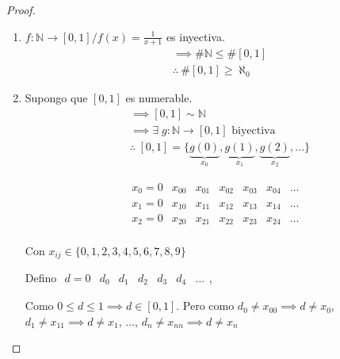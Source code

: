 \begin{proof}\phantom{.}

    \begin{enumerate}
        \item $f: \mathbb{N} \to [0,1] / f(x) = \frac{1}{x+1}$ es inyectiva.
            \begin{align*}
                &\implies \# \mathbb{N} \leq \# [0,1] \\
                &\therefore ~ \# [0,1] \geq \aleph_0
            \end{align*}

        \item Supongo que $[0,1]$ es numerable.
            \begin{align*}
                &\implies [0,1] \sim \mathbb{N} \\
                &\implies \exists \; g:\mathbb{N}\to [0,1] \text{ biyectiva}\\
                &\therefore ~ [0,1] = \{ \underbrace{g(0)}_{x_0}, 
                \underbrace{g(1)}_{x_1}, \underbrace{g(2)}_{x_2}, \dotsc \}
            \end{align*}

            \begin{equation*}
                \begin{matrix}
                    x_0 = 0 & x_{00} & x_{01} & x_{02} & x_{03} & x_{04} 
                            & \dots\\
                    x_1 = 0 & x_{10} & x_{11} & x_{12} & x_{13} & x_{14}
                            & \dots \\
                    x_2 = 0 & x_{20} & x_{21} & x_{22} & x_{23} & x_{24}
                            & \dots \\
                \end{matrix}
            \end{equation*}
            
            Con $x_{ij} \in \{0,1,2,3,4,5,6,7,8,9\}$


            Defino $\begin{matrix} 
                d = 0 & d_0 & d_1 & d_2 & d_3 & d_4 & \dots 
            \end{matrix}$,

            Como $0 \leq d \leq 1 \implies d \in [0,1]$.
            Pero como $d_0 \neq x_{00} \implies d \neq x_0$, 
            $d_1 \neq x_{11} \implies d \neq x_1$, $\dots$,
            $d_n \neq x_{nn} \implies d \neq x_n$


\end{enumerate}
\end{proof}
